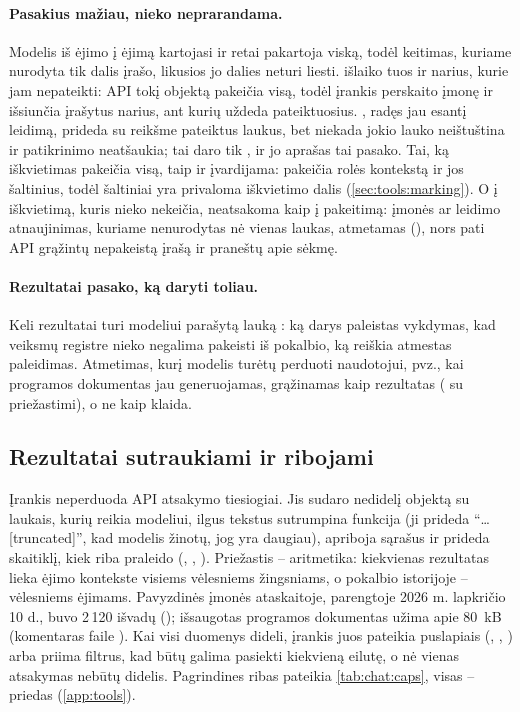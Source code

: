 \paragraph{Pasakius mažiau, nieko neprarandama.} Modelis iš ėjimo į ėjimą kartojasi ir retai
pakartoja viską, todėl keitimas, kuriame nurodyta tik dalis įrašo, likusios jo dalies neturi
liesti.  išlaiko tuos  ir  narius,
kurie jam nepateikti: API tokį objektą pakeičia visą, todėl įrankis perskaito įmonę ir
išsiunčia įrašytus narius, ant kurių uždeda pateiktuosius. , radęs jau
esantį leidimą, prideda su reikšme pateiktus laukus, bet niekada jokio lauko neištuština ir
patikrinimo neatšaukia; tai daro tik , ir jo aprašas tai pasako. Tai,
ką iškvietimas pakeičia visą, taip ir įvardijama:  pakeičia rolės kontekstą ir
jos šaltinius, todėl šaltiniai yra privaloma iškvietimo dalis (\cref{sec:tools:marking}). O į
iškvietimą, kuris nieko nekeičia, neatsakoma kaip į pakeitimą: įmonės ar leidimo atnaujinimas,
kuriame nenurodytas nė vienas laukas, atmetamas (), nors pati API
grąžintų nepakeistą įrašą ir praneštų apie sėkmę.

\paragraph{Rezultatai pasako, ką daryti toliau.} Keli rezultatai turi modeliui parašytą lauką
: ką darys paleistas vykdymas, kad veiksmų registre nieko negalima pakeisti iš
pokalbio, ką reiškia atmestas paleidimas. Atmetimas, kurį modelis turėtų perduoti naudotojui,
pvz., kai programos dokumentas jau generuojamas, grąžinamas kaip rezultatas
( su priežastimi), o ne kaip klaida.

\subsection{Rezultatai sutraukiami ir ribojami}\label{sec:chat:caps}

Įrankis neperduoda API atsakymo tiesiogiai. Jis sudaro nedidelį objektą su laukais, kurių reikia
modeliui, ilgus tekstus sutrumpina funkcija  (ji prideda \enquote{…[truncated]},
kad modelis žinotų, jog yra daugiau), apriboja sąrašus ir prideda skaitiklį, kiek riba praleido
(, , ). Priežastis -- aritmetika: kiekvienas
rezultatas lieka ėjimo kontekste visiems vėlesniems žingsniams, o pokalbio istorijoje --
vėlesniems ėjimams. Pavyzdinės įmonės ataskaitoje, parengtoje 2026 m. lapkričio 10 d., buvo
2\,120 išvadų (); išsaugotas programos dokumentas užima apie
80~kB (komentaras faile ). Kai visi duomenys dideli, įrankis juos
pateikia puslapiais (, , ) arba priima filtrus, kad
būtų galima pasiekti kiekvieną eilutę, o nė vienas atsakymas nebūtų didelis. Pagrindines ribas
pateikia \cref{tab:chat:caps}, visas -- priedas (\cref{app:tools}).

